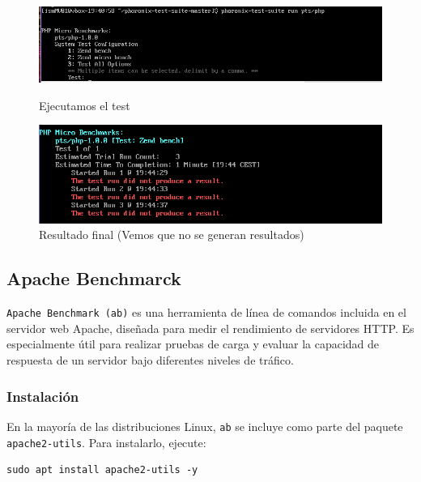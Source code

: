 \begin{itemize}
\begin{figure}[H]
\begin{minipage}{0.45\textwidth}
            \centering
            \includegraphics[width=\textwidth]{images/Bloque2/mv-pho-4.png}
            \caption{Ejecutamos el test}
            \label{fig:image9}
        \end{minipage}
        \hfill
        \begin{minipage}{0.45\textwidth}
            \centering
            \includegraphics[width=\textwidth]{images/Bloque2/mv-pho-5.png}
            \caption{Resultado final (Vemos que no se generan resultados)}
            \label{fig:image10}
        \end{minipage}
    \end{figure}
    
\end{itemize}



\subsection{Apache Benchmarck}


\texttt{Apache Benchmark (ab)} es una herramienta de línea de comandos incluida en el servidor web Apache, diseñada para medir el rendimiento de servidores HTTP. Es especialmente útil para realizar pruebas de carga y evaluar la capacidad de respuesta de un servidor bajo diferentes niveles de tráfico.

\subsubsection{Instalación}

En la mayoría de las distribuciones Linux, \texttt{ab} se incluye como parte del paquete \texttt{apache2-utils}. Para instalarlo, ejecute:

\begin{lstlisting}[style=customstyle]
sudo apt install apache2-utils -y
\end{lstlisting}

